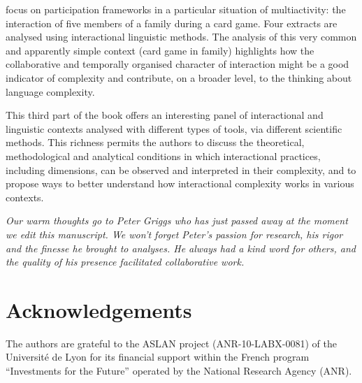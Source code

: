 \documentclass[output=paper]{langscibook}
\begin{document}
 focus on participation frameworks in a particular situation of multiactivity: the interaction of five members of a family during a card game. Four extracts are analysed using interactional linguistic methods. The analysis of this very common and apparently simple context (card game in family) highlights how the collaborative and temporally organised character of interaction might be a good indicator of complexity and contribute, on a broader level, to the thinking about language complexity.

This third part of the book offers an interesting panel of interactional and linguistic contexts analysed with different types of tools, via different scientific methods. This richness permits the authors to discuss the theoretical, methodological and analytical conditions in which interactional practices, including dimensions, can be observed and interpreted in their complexity, and to propose ways to better understand how interactional complexity works in various contexts.

\begin{center}
\parbox{\textwidth-2cm}{%
\textit{Our warm thoughts go to Peter Griggs who has just passed away at the moment we edit this manuscript. We won’t forget Peter’s passion for research, his rigor and the finesse he brought to analyses. He always had a kind word for others, and the quality of his presence facilitated collaborative work.} }
\end{center} 

\section*{Acknowledgements}\largerpage
The authors are grateful to the ASLAN project (ANR-10-LABX-0081) of the Université de Lyon for its financial support within the French program “Investments for the Future” operated by the National Research Agency (ANR).

{\sloppy\printbibliography[heading=subbibliography,notkeyword=this]}
\end{document}
